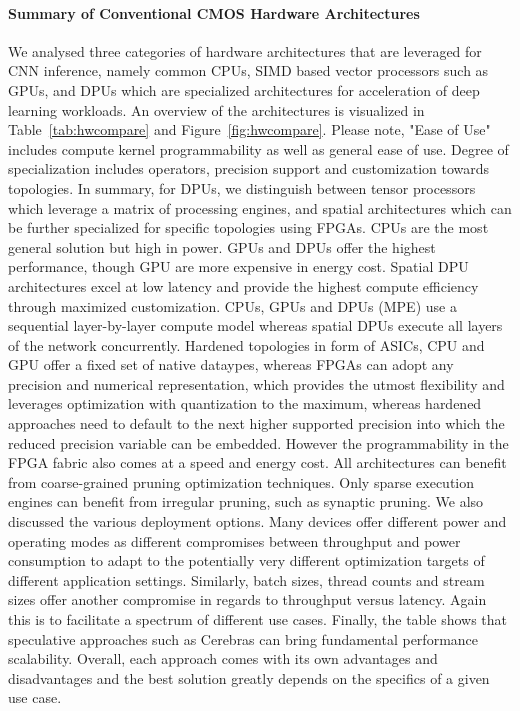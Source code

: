 \paragraph*{Summary of Conventional CMOS Hardware Architectures}

We analysed three categories of hardware architectures that are leveraged for CNN inference, namely common CPUs, SIMD based vector processors such as GPUs, and DPUs which are specialized architectures for acceleration of deep learning workloads. 
An overview of the architectures is visualized in Table~\ref{tab:hwcompare} and Figure~\ref{fig:hwcompare}.
Please note, "Ease of Use" includes compute kernel programmability as well as general ease of use.
Degree of specialization includes operators, precision support and customization towards topologies.
In summary, for DPUs, we distinguish between tensor processors which leverage a matrix of processing engines, and spatial architectures which can be further specialized for specific topologies using FPGAs.
CPUs are the most general solution but high in power. GPUs and DPUs offer the highest performance, though GPU are more expensive in energy cost. Spatial DPU architectures excel at low latency and provide the highest compute efficiency through maximized customization. 
CPUs, GPUs and DPUs (MPE) use a sequential layer-by-layer compute model whereas spatial DPUs execute all layers of the network concurrently. 
Hardened topologies in form of ASICs, CPU and GPU offer a fixed set of native dataypes, whereas FPGAs can adopt any precision and numerical representation, which provides the utmost flexibility and leverages optimization with quantization to the maximum, whereas hardened approaches need to default to the next higher supported precision into which the reduced precision variable can be embedded. However the programmability in the FPGA fabric also comes at a speed and energy cost.
All architectures can benefit from coarse-grained pruning optimization techniques. Only sparse execution engines can benefit from irregular pruning, such as synaptic pruning.
We also discussed the various deployment options. 
Many devices offer different power and operating modes as different compromises between throughput and power consumption to adapt to the potentially very different optimization targets of different application settings. Similarly, batch sizes, thread counts and stream sizes offer another compromise in regards to throughput versus latency. Again this is to facilitate a spectrum of different use cases.
Finally, the table shows that speculative approaches such as Cerebras can bring fundamental performance scalability.
Overall, each approach comes with its own advantages and disadvantages and the best solution greatly depends on the specifics of a given use case.


